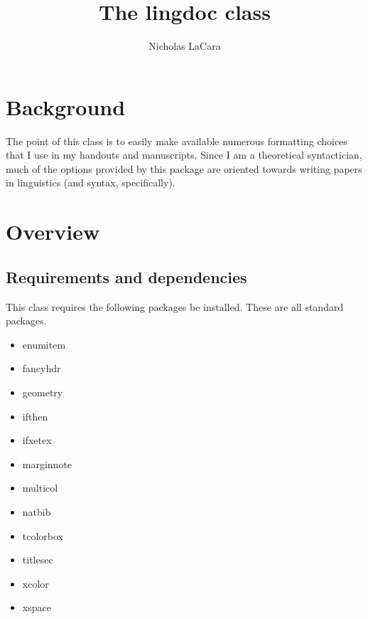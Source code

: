 \documentclass[11pt, tipa, color]{./lingdoc}
\title[The lingdoc class]{The lingdoc class}
\author{Nicholas LaCara}
\affiliation{University of Toronto}
\newcommand{\Package}[1]{\textsf{{#1}}}
\begin{document}
    
  
       
  \tableofcontents
  
  \section{Background}
  
    The point of this class is to easily make available numerous formatting choices that I use in my handouts and manuscripts. Since I am a theoretical syntactician, much of the options provided by this package are oriented towards writing papers in linguistics (and syntax, specifically).

  \section{Overview}
  
  \subsection{Requirements and dependencies}
  
    This class requires the following packages be installed. These are all standard packages.
    
      \begin{multicols}{3}
	\begin{itemize}
	  \item \Package{enumitem}
	  \item \Package{fancyhdr}
	  \item \Package{geometry}
	  \item \Package{ifthen}
	  \item \Package{ifxetex}
	  \item \Package{marginnote}
	  \item \Package{multicol}
	  \item \Package{natbib}
	  \item \Package{tcolorbox}
	  \item \Package{titlesec}
	  \item \Package{xcolor}
	  \item \Package{xspace}
	\end{itemize}
	
%       

      \end{multicols}
      
\end{document}
